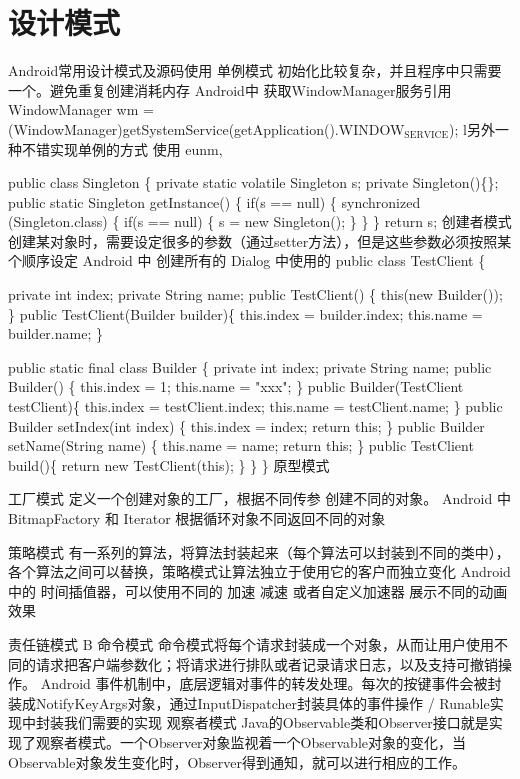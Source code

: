 \documentclass[9pt, b5paper]{article}
\begin{document}
\section{设计模式}
\label{sec-15}
Android常用设计模式及源码使用
单例模式
初始化比较复杂，并且程序中只需要一个。避免重复创建消耗内存
Android中 获取WindowManager服务引用 WindowManager wm = (WindowManager)getSystemService(getApplication().WINDOW$_{\text{SERVICE}}$);
l另外一种不错实现单例的方式 使用 eunm,

public class Singleton \{
    private static volatile Singleton s;
    private Singleton()\{\};
    public static Singleton getInstance() \{  
        if(s == null) \{
            synchronized (Singleton.class) \{
                if(s == null) \{
                    s = new Singleton(); 
                \}
            \}
        \}
        return s; 
创建者模式
创建某对象时，需要设定很多的参数（通过setter方法），但是这些参数必须按照某个顺序设定
Android 中 创建所有的 Dialog 中使用的
public class TestClient \{

private int index;
private String name;
public TestClient() \{
    this(new Builder());
\}
public TestClient(Builder builder)\{
    this.index = builder.index;
    this.name = builder.name;
\}

    public static final class Builder \{
        private int index;
        private String name;
        public Builder() \{
            this.index = 1;
            this.name = "xxx";
        \}
        public Builder(TestClient testClient)\{
            this.index = testClient.index;
            this.name = testClient.name;
        \}
        public Builder setIndex(int index) \{
            this.index = index;
            return this;
        \}
        public Builder setName(String name) \{
            this.name = name;
            return this;
        \}
        public TestClient build()\{
            return new TestClient(this);
        \}
    \}
\}
原型模式

工厂模式
定义一个创建对象的工厂，根据不同传参 创建不同的对象。
Android 中 BitmapFactory 和 Iterator 根据循环对象不同返回不同的对象

策略模式
有一系列的算法，将算法封装起来（每个算法可以封装到不同的类中），各个算法之间可以替换，策略模式让算法独立于使用它的客户而独立变化
Android 中的 时间插值器，可以使用不同的 加速 减速 或者自定义加速器 展示不同的动画效果

责任链模式
B
命令模式
命令模式将每个请求封装成一个对象，从而让用户使用不同的请求把客户端参数化；将请求进行排队或者记录请求日志，以及支持可撤销操作。
Android 事件机制中，底层逻辑对事件的转发处理。每次的按键事件会被封装成NotifyKeyArgs对象，通过InputDispatcher封装具体的事件操作 / Runable实现中封装我们需要的实现
观察者模式
Java的Observable类和Observer接口就是实现了观察者模式。一个Observer对象监视着一个Observable对象的变化，当Observable对象发生变化时，Observer得到通知，就可以进行相应的工作。
\end{document}
